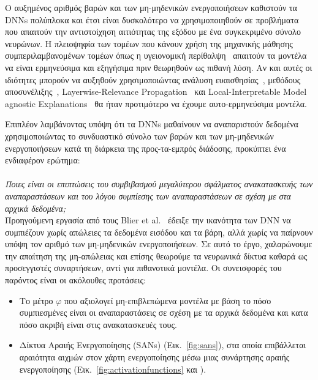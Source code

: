 Ο αυξημένος αριθμός βαρών και των μη-μηδενικών ενεργοποιήσεων καθιστούν τα DNNs  πολύπλοκα και έτσι είναι δυσκολότερο να χρησιμοποιηθούν σε προβλήματα που απαιτούν την αντιστοίχηση αιτιότητας της εξόδου με ένα συγκεκριμένο σύνολο νευρώνων.
Η πλειοψηφία των τομέων που κάνουν χρήση της μηχανικής μάθησης συμπεριλαμβανομένων τομέων όπως η υγειονομική περίθαλψη~\cite{bizopoulos2019deep} απαιτούν τα μοντέλα να είναι ερμηνεύσιμα και εξηγήσιμα πριν θεωρηθούν ως πιθανή λύση.
Αν και αυτές οι ιδιότητες μπορούν να αυξηθούν χρησιμοποιώντας ανάλυση ευαισθησίας~\cite{simonyan2013deep}, μεθόδους αποσυνέλιξης~\cite{zeiler2014visualizing}, Layerwise-Relevance Propagation~\cite{bach2015pixel} και Local-Interpretable Model agnostic Explanations~\cite{ribeiro2016should} θα ήταν προτιμότερο να έχουμε αυτο-ερμηνεύσιμα μοντέλα.

Επιπλέον λαμβάνοντας υπόψη ότι τα DNNs μαθαίνουν να αναπαριστούν δεδομένα χρησιμοποιώντας το συνδυαστικό σύνολο των βαρών και των μη-μηδενικών ενεργοποιήσεων κατά τη διάρκεια της προς-τα-εμπρός διάδοσης, προκύπτει ένα ενδιαφέρον ερώτημα:
\\\\
\indent\textit{Ποιες είναι οι επιπτώσεις του συμβιβασμού μεγαλύτερου σφάλματος ανακατασκευής των αναπαραστάσεων και του λόγου συμπίεσης των αναπαραστάσεων σε σχέση με στα αρχικά δεδομένα;}
\\

Προηγούμενη εργασία από τους Blier et al.~\cite{blier2018description} έδειξε την ικανότητα των DNN να συμπιέζουν χωρίς απώλειες τα δεδομένα εισόδου και τα βάρη, αλλά χωρίς να παίρνουν υπόψη τον αριθμό των μη-μηδενικών ενεργοποιήσεων.
Σε αυτό το έργο, χαλαρώνουμε την απαίτηση της μη-απώλειας και επίσης θεωρούμε τα νευρωνικά δίκτυα καθαρά ως προσεγγιστές συναρτήσεων, αντί για πιθανοτικά μοντέλα.
Οι συνεισφορές του παρόντος είναι οι ακόλουθες προτάσεις:
\begin{itemize}
	\item Το μέτρο $\varphi$ που αξιολογεί μη-επιβλεπώμενα μοντέλα με βάση το πόσο συμπιεσμένες είναι οι αναπαραστάσεις σε σχέση με τα αρχικά δεδομένα και κατα πόσο ακριβή είναι στις ανακατασκευές τους.
	\item Δίκτυα Αραιής Ενεργοποίησης (SANs) (Εικ.~\ref{fig:sans}), στα οποία επιβάλλεται αραιότητα αιχμών στον χάρτη ενεργοποίησης μέσω μιας συνάρτησης αραιής ενεργοποίησης (Εικ.~\ref{fig:activationfunctions} και ).
\end{itemize}

